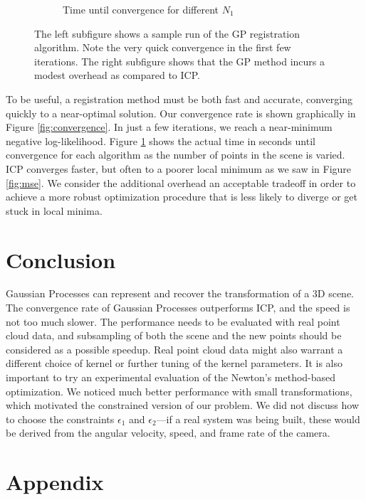 \documentclass{article} %
\begin{document}
\begin{figure}[h!]
\begin{subfigure}[b]{0.5\textwidth}
                \caption{Time until convergence for different $N_1$}
                \label{fig:timing}
        \end{subfigure}
        \caption{The left subfigure shows a sample run of the GP registration algorithm. Note the very quick convergence in the first few iterations. The right subfigure shows that the GP method incurs a modest overhead as compared to ICP.}\label{fig:tests1}
\end{figure}

To be useful, a registration method must be both fast and accurate, converging quickly to a near-optimal solution. Our convergence rate is shown graphically in Figure \ref{fig:convergence}. In just a few iterations, we reach a near-minimum negative log-likelihood. Figure \ref{fig:timing} shows the actual time in seconds until convergence for each algorithm as the number of points in the scene is varied. ICP converges faster, but often to a poorer local minimum as we saw in Figure \ref{fig:mse}. We consider the additional overhead an acceptable tradeoff in order to achieve a more robust optimization procedure that is less likely to diverge or get stuck in local minima.

\section{Conclusion}
Gaussian Processes can represent and recover the transformation of a 3D scene. The convergence rate of Gaussian Processes outperforms ICP,
and the speed is not too much slower. The performance needs to be evaluated with real point cloud data, and subsampling of both the scene and the new points should be considered as a possible speedup. Real point cloud data might also warrant a different choice of kernel or further tuning of the kernel parameters. It is also important to try an experimental evaluation of the Newton's method-based optimization.
We noticed much better performance with small transformations, which motivated the constrained version of our problem. We did not discuss how to choose the constraints $\epsilon_1$ and $\epsilon_2$---if a real system was being built, these would be derived from the angular velocity, speed, and frame rate of the camera. 





\section{Appendix}
\end{document}
